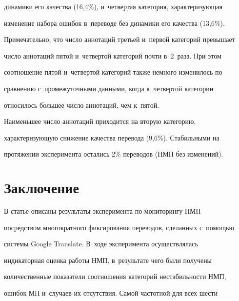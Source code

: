 динамики его качества (16,4\%), и~четвертая категория, характеризующая 


изменение набора ошибок в~переводе без динамики его качества (13,6\%). 


Примечательно, что чис\-ло аннотаций третьей и~первой категорий превышает 


чис\-ло аннотаций пятой и~четвертой категорий почти в~2~раза. При этом 


соотношение пятой и~чет\-вер\-той категорий также немного изменилось по 


срав\-не\-нию с~промежуточными данными, когда к~четвертой категории 


относилось б$\acute{\mbox{о}}$льшее число аннотаций, чем к~пятой. 


   


   Наименьшее число аннотаций приходится на вторую категорию, 


характеризующую снижение качества перевода (9,6\%). Стабильными на 


протяжении эксперимента остались 2\% переводов (НМП без изменений).










\section{Заключение}







   


   В статье описаны результаты эксперимента по мониторингу НМП 


посредством многократного фиксирования переводов, сделанных с~по\-мощью 


системы Google Translate. В~ходе эксперимента осуществлялась 


индикаторная оценка работы НМП, в~результате чего были получены 


количественные показатели соотношения категорий нестабильности НМП, 


ошибок МП и~случаев их отсутствия. Самой час\-тот\-ной для всех шести 


